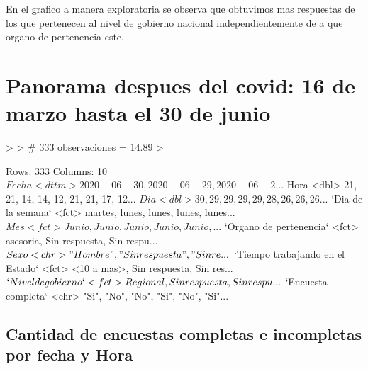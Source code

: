 \documentclass{article}
\begin{document}
En el grafico a manera exploratoria se observa que obtuvimos mas respuestas de los que pertenecen al nivel de gobierno nacional independientemente de a que organo de pertenencia este.

\section{Panorama despues del covid: 16 de marzo hasta el 30 de junio}

\begin{Schunk}
\begin{Sinput}
> 
> # 333 observaciones = 14.89%
> 
\end{Sinput}
\end{Schunk}


\begin{Schunk}
\begin{Soutput}
Rows: 333
Columns: 10
$ Fecha                            <dttm> 2020-06-30, 2020-06-29, 2020-06-2...
$ Hora                             <dbl> 21, 21, 14, 14, 12, 21, 21, 17, 12...
$ Dia                              <dbl> 30, 29, 29, 29, 29, 28, 26, 26, 26...
$ `Dia de la semana`               <fct> martes, lunes, lunes, lunes, lunes...
$ Mes                              <fct> Junio, Junio, Junio, Junio, Junio,...
$ `Organo de pertenencia`          <fct> asesoria, Sin respuesta, Sin respu...
$ Sexo                             <chr> "Hombre", "Sin respuesta", "Sin re...
$ `Tiempo trabajando en el Estado` <fct> <10 a mas>, Sin respuesta, Sin res...
$ `Nivel de gobierno`              <fct> Regional, Sin respuesta, Sin respu...
$ `Encuesta completa`              <chr> "Si", "No", "No", "Si", "No", "Si"...
\end{Soutput}
\end{Schunk}


\subsection{Cantidad de encuestas completas e incompletas por fecha y Hora}
\end{document}
